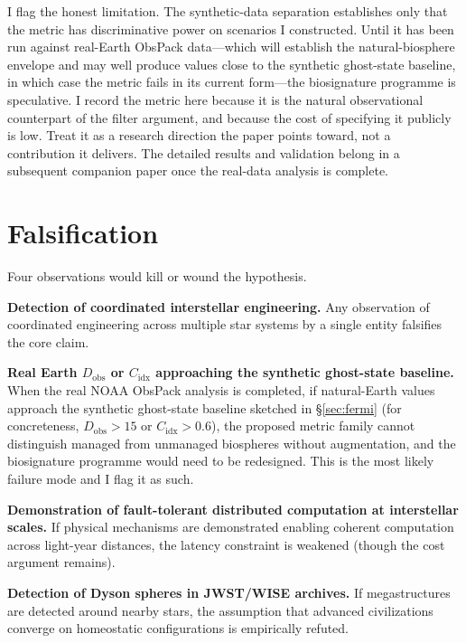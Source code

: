 \documentclass[11pt,a4paper,twocolumn]{article}
\begin{document}
I flag the honest limitation. The synthetic-data separation
establishes only that the metric has discriminative power on
scenarios I constructed. Until it has been run against real-Earth
ObsPack data---which will establish the natural-biosphere envelope
and may well produce values close to the synthetic ghost-state
baseline, in which case the metric fails in its current form---the
biosignature programme is speculative. I record the metric here
because it is the natural observational counterpart of the filter
argument, and because the cost of specifying it publicly is
low. Treat it as a research direction the paper points toward, not
a contribution it delivers. The detailed results and validation
belong in a subsequent companion paper once the real-data analysis
is complete.


\section{Falsification}
\label{sec:falsification}

Four observations would kill or wound the hypothesis.

\textbf{Detection of coordinated interstellar engineering.} Any
observation of coordinated engineering across multiple star systems by
a single entity falsifies the core claim.

\textbf{Real Earth $D_\mathrm{obs}$ or $C_\mathrm{idx}$ approaching
the synthetic ghost-state baseline.} When the real NOAA ObsPack
analysis is completed, if natural-Earth values approach the
synthetic ghost-state baseline sketched in \S\ref{sec:fermi} (for
concreteness, $D_\mathrm{obs} > 15$ or $C_\mathrm{idx} > 0.6$), the
proposed metric family cannot distinguish managed from unmanaged
biospheres without augmentation, and the biosignature programme
would need to be redesigned. This is the most likely failure mode
and I flag it as such.

\textbf{Demonstration of fault-tolerant distributed computation at
interstellar scales.} If physical mechanisms are demonstrated enabling
coherent computation across light-year distances, the latency constraint
is weakened (though the cost argument remains).

\textbf{Detection of Dyson spheres in JWST/WISE archives.} If
megastructures are detected around nearby stars, the assumption that
advanced civilizations converge on homeostatic configurations is
empirically refuted.
\end{document}
